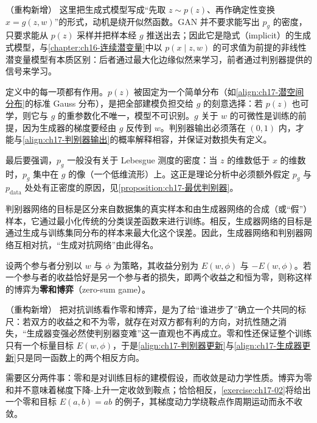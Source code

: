 \documentclass[../../main.tex]{subfiles}
\begin{document}
\begin{remark}（重构新增）
这里把生成式模型写成“先取 $z\sim p(z)$、再作确定性变换 $x=g(z,w)$”的形式，动机是绕开似然函数。GAN 并不要求能写出 $p_g$ 的密度，只要求能从 $p(z)$ 采样并把样本经 $g$ 推送出去；因此它是隐式（implicit）的生成式模型，与\cref{chapter:ch16-连续潜变量}中以 $p(x\mid z,w)$ 的可求值为前提的非线性潜变量模型有本质区别：后者通过最大化边缘似然来学习，前者通过判别器提供的信号来学习。

定义中的每一项都有作用。$p(z)$ 被固定为一个简单分布（如\eqref{align:ch17-潜空间分布}的标准 Gauss 分布），是把全部建模负担交给 $g$ 的刻意选择：若 $p(z)$ 也可学，则它与 $g$ 的重参数化不唯一，模型不可识别。$g$ 关于 $w$ 的可微性是训练的前提，因为生成器的梯度要经由 $g$ 反传到 $w$。判别器输出必须落在 $(0,1)$ 内，才能与\eqref{align:ch17-判别器输出}的概率解释相容，并保证对数损失有定义。

最后要强调，$p_g$ 一般没有关于 Lebesgue 测度的密度：当 $z$ 的维数低于 $x$ 的维数时，$p_g$ 集中在 $g$ 的像（一个低维流形）上。这正是理论分析中必须额外假定 $p_g$ 与 $p_{\mathrm{data}}$ 处处有正密度的原因，见\cref{proposition:ch17-最优判别器}。
\end{remark}

判别器网络的目标是区分来自数据集的真实样本和由生成器网络的合成（或“假”）样本，它通过最小化传统的分类误差函数来进行训练。相反，生成器网络的目标是通过生成与训练集同分布的样本来最大化这个误差。因此，生成器网络和判别器网络互相对抗，“生成对抗网络”由此得名。

\begin{definition}[零和博弈]\label{definition:ch17-零和博弈}
设两个参与者分别以 $w$ 与 $\phi$ 为策略，其收益分别为 $E(w,\phi)$ 与 $-E(w,\phi)$。若一个参与者的收益恰好是另一个参与者的损失，即两个收益之和恒为零，则称这样的博弈为\textbf{零和博弈}（zero-sum game）。
\end{definition}

\begin{remark}（重构新增）
把对抗训练看作零和博弈，是为了给“谁进步了”确立一个共同的标尺：若双方的收益之和不为零，就存在对双方都有利的方向，对抗性随之消失，“生成器变强必然使判别器变难”这一直观也不再成立。零和性还保证整个训练只有一个标量目标 $E(w,\phi)$，于是\eqref{align:ch17-判别器更新}与\eqref{align:ch17-生成器更新}只是同一函数上的两个相反方向。

需要区分两件事：零和是对训练目标的建模假设，而收敛是动力学性质。博弈为零和并不意味着梯度下降-上升一定收敛到鞍点；恰恰相反，\cref{exercise:ch17-02}将给出一个零和目标 $E(a,b)=ab$ 的例子，其梯度动力学绕鞍点作周期运动而永不收敛。
\end{remark}
\end{document}
